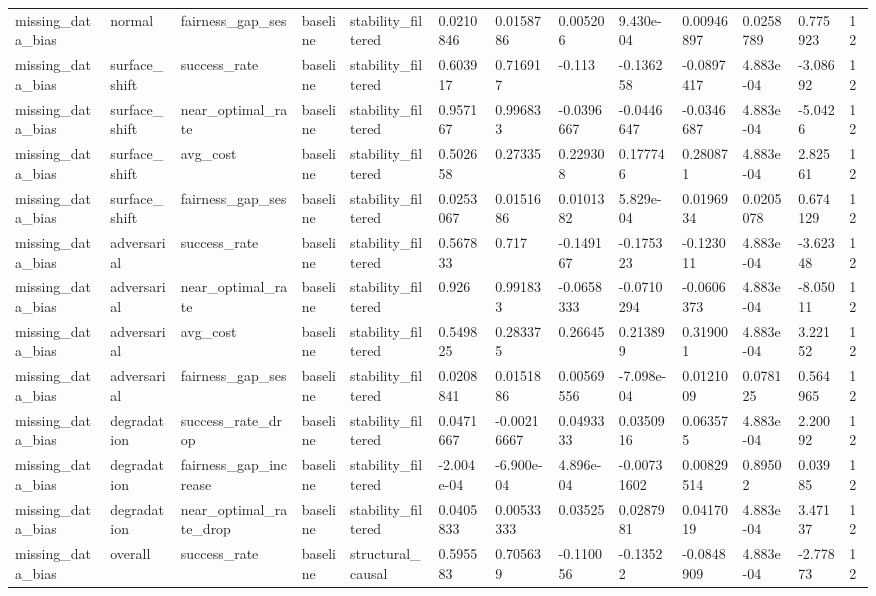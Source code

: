 \begin{tabular}{lllllllllllll}
missing\_data\_bias & normal & fairness\_gap\_ses & baseline & stability\_filtered & 0.0210846 & 0.0158786 & 0.005206 & 9.430e-04 & 0.00946897 & 0.0258789 & 0.775923 & 12 \\
missing\_data\_bias & surface\_shift & success\_rate & baseline & stability\_filtered & 0.603917 & 0.716917 & -0.113 & -0.136258 & -0.0897417 & 4.883e-04 & -3.08692 & 12 \\
missing\_data\_bias & surface\_shift & near\_optimal\_rate & baseline & stability\_filtered & 0.957167 & 0.996833 & -0.0396667 & -0.0446647 & -0.0346687 & 4.883e-04 & -5.0426 & 12 \\
missing\_data\_bias & surface\_shift & avg\_cost & baseline & stability\_filtered & 0.502658 & 0.27335 & 0.229308 & 0.177746 & 0.280871 & 4.883e-04 & 2.82561 & 12 \\
missing\_data\_bias & surface\_shift & fairness\_gap\_ses & baseline & stability\_filtered & 0.0253067 & 0.0151686 & 0.0101382 & 5.829e-04 & 0.0196934 & 0.0205078 & 0.674129 & 12 \\
missing\_data\_bias & adversarial & success\_rate & baseline & stability\_filtered & 0.567833 & 0.717 & -0.149167 & -0.175323 & -0.123011 & 4.883e-04 & -3.62348 & 12 \\
missing\_data\_bias & adversarial & near\_optimal\_rate & baseline & stability\_filtered & 0.926 & 0.991833 & -0.0658333 & -0.0710294 & -0.0606373 & 4.883e-04 & -8.05011 & 12 \\
missing\_data\_bias & adversarial & avg\_cost & baseline & stability\_filtered & 0.549825 & 0.283375 & 0.26645 & 0.213899 & 0.319001 & 4.883e-04 & 3.22152 & 12 \\
missing\_data\_bias & adversarial & fairness\_gap\_ses & baseline & stability\_filtered & 0.0208841 & 0.0151886 & 0.00569556 & -7.098e-04 & 0.0121009 & 0.078125 & 0.564965 & 12 \\
missing\_data\_bias & degradation & success\_rate\_drop & baseline & stability\_filtered & 0.0471667 & -0.00216667 & 0.0493333 & 0.0350916 & 0.063575 & 4.883e-04 & 2.20092 & 12 \\
missing\_data\_bias & degradation & fairness\_gap\_increase & baseline & stability\_filtered & -2.004e-04 & -6.900e-04 & 4.896e-04 & -0.00731602 & 0.00829514 & 0.89502 & 0.03985 & 12 \\
missing\_data\_bias & degradation & near\_optimal\_rate\_drop & baseline & stability\_filtered & 0.0405833 & 0.00533333 & 0.03525 & 0.0287981 & 0.0417019 & 4.883e-04 & 3.47137 & 12 \\
missing\_data\_bias & overall & success\_rate & baseline & structural\_causal & 0.595583 & 0.705639 & -0.110056 & -0.13522 & -0.0848909 & 4.883e-04 & -2.77873 & 12 \\

\end{tabular}

